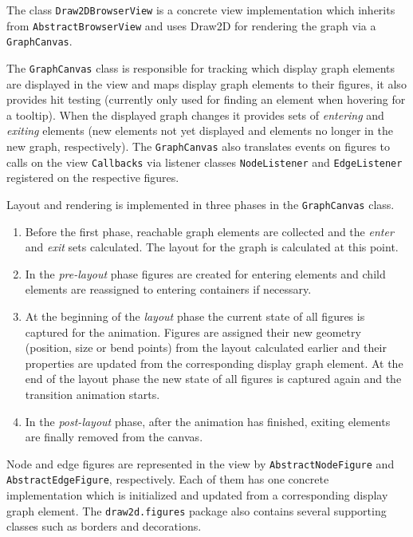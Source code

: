 The class \lstinline|Draw2DBrowserView| is a concrete view implementation which inherits from 
\lstinline|AbstractBrowserView| and uses Draw2D for rendering the graph via a \lstinline|GraphCanvas|.

The \lstinline|GraphCanvas| class is responsible for tracking which display graph elements are displayed in the view 
and maps display graph elements to their figures, it also provides hit testing (currently only used for finding an 
element when hovering for a tooltip). When the displayed graph changes it provides sets of \emph{entering} and 
\emph{exiting} elements (new elements not yet displayed and elements no longer in the new graph, respectively). The 
\lstinline|GraphCanvas| also translates events on figures to calls on the view \lstinline|Callbacks| via listener 
classes \lstinline|NodeListener| and \lstinline|EdgeListener| registered on the respective figures.

Layout and rendering is implemented in three phases in the \lstinline|GraphCanvas| class.
\begin{enumerate}[start=0]
  \item Before the first phase, reachable graph elements are collected and the \emph{enter} and \emph{exit} sets 
  calculated. The layout for the graph is calculated at this point.
  
  \item In the \emph{pre-layout} phase figures are created for entering elements and child elements are reassigned to 
  entering containers if necessary.
  
  \item At the beginning of the \emph{layout} phase the current state of all figures is captured for the animation. 
  Figures are assigned their new geometry (position, size or bend points) from the layout calculated earlier and their 
  properties are updated from the corresponding display graph element. At the end of the layout phase the new state of 
  all figures is captured again and the transition animation starts.
  
  \item In the \emph{post-layout} phase, after the animation has finished, exiting elements are finally removed from 
  the canvas.
\end{enumerate}

Node and edge figures are represented in the view by \lstinline|AbstractNodeFigure| and \lstinline|AbstractEdgeFigure|, 
respectively. Each of them has one concrete implementation which is initialized and updated from a corresponding 
display graph element. The \lstinline|draw2d.figures| package also contains several supporting classes such as borders 
and decorations.

